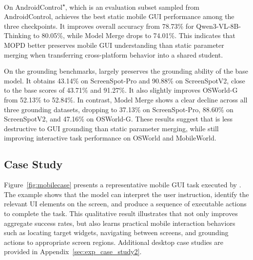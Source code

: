 On AndroidControl\textsuperscript{$\star$}, which is an evaluation subset
sampled from AndroidControl, \METHODNAME achieves the best static mobile GUI
performance among the three checkpoints. It improves overall accuracy from
78.73\% for Qwen3-VL-8B-Thinking to 80.05\%, while Model Merge drops to
74.01\%. This indicates that MOPD better preserves mobile GUI understanding
than static parameter merging when transferring cross-platform behavior into
a shared student.

On the grounding benchmarks, \METHODNAME largely preserves the grounding
ability of the base model. It obtains 43.14\% on ScreenSpot-Pro and 90.88\%
on ScreenSpotV2, close to the base scores of 43.71\% and 91.27\%. It also
slightly improves OSWorld-G from 52.13\% to 52.84\%. In contrast, Model Merge
shows a clear decline across all three grounding datasets, dropping to
37.13\% on ScreenSpot-Pro, 88.60\% on ScreenSpotV2, and 47.16\% on
OSWorld-G. These results suggest that \METHODNAME is less destructive to GUI
grounding than static parameter merging, while still improving interactive
task performance on OSWorld and MobileWorld.







\subsection{Case Study}
\label{sec:exp_case_study}

Figure~\ref{fig:mobilecase} presents a representative mobile GUI task
executed by \METHODNAME. The example shows that the model can interpret the
user instruction, identify the relevant UI elements on the screen, and produce
a sequence of executable actions to complete the task. This qualitative result
illustrates that \METHODNAME not only improves aggregate success rates, but
also learns practical mobile interaction behaviors such as locating target
widgets, navigating between screens, and grounding actions to appropriate
screen regions. Additional desktop case studies are provided in
Appendix~\ref{sec:exp_case_study2}.

\FloatBarrier
